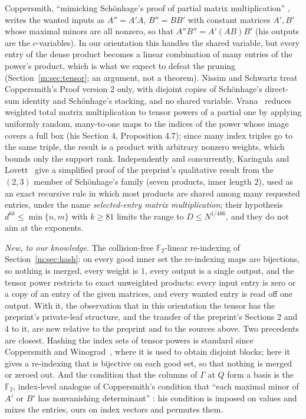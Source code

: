 \documentclass[11pt]{article}
\theoremstyle{definition}
\theoremstyle{remark}
\newcommand{\F}{\mathbb{F}_2}
\begin{document}
Coppersmith, ``mimicking Schönhage's proof of partial matrix multiplication'' \cite[p.~468]{Cop82}, writes the wanted inputs as $A''=A'A$, $B''=BB'$ with constant matrices $A',B'$ whose maximal minors are all nonzero, so that $A''B''=A'(AB)B'$ (his outputs are the $c$-variables). In our orientation this handles the shared variable, but every entry of the dense product becomes a linear combination of many entries of the power's product, which is what we expect to defeat the pruning (Section~\ref{m:sec:tensor}; an argument, not a theorem). Nissim and Schwartz treat Coppersmith's Proof version 2 only, with disjoint copies of Schönhage's direct-sum identity and Schönhage's stacking, and no shared variable. Vrana~\cite{Vra24} reduces weighted total matrix multiplication to tensor powers of a partial one by applying uniformly random, many-to-one maps to the indices of the power whose image covers a full box (his Section 4, Proposition 4.7); since many index triples go to the same triple, the result is a product with arbitrary nonzero weights, which bounds only the support rank.
Independently and concurrently, Karingula and Lovett~\cite{KL26} give a simplified proof of the preprint's qualitative result from the $(2,3)$ member of Schönhage's family (seven products, inner length $2$), used as an exact recursive rule in which most products are shared among many requested entries, under the name \emph{selected-entry matrix multiplication}; their hypothesis $d^{6k}\le\min\{n,m\}$ with $k\ge81$ limits the range to $D\le N^{1/486}$, and they do not aim at the exponents.

\emph{New, to our knowledge.} The collision-free $\F$-linear re-indexing of Section~\ref{m:sec:hash}: on every good inner set the re-indexing maps are bijections, so nothing is merged, every weight is $1$, every output is a single output, and the tensor power restricts to exact unweighted products: every input entry is zero or a copy of an entry of the given matrices, and every wanted entry is read off one output. With it, the observation that in this orientation the tensor has the preprint's private-leaf structure, and the transfer of the preprint's Sections 2 and 4 to it, are new relative to the preprint and to the sources above. Two precedents are closest. Hashing the index sets of tensor powers is standard since Coppersmith and Winograd~\cite{CW90}, where it is used to obtain disjoint blocks; here it gives a re-indexing that is bijective on each good set, so that nothing is merged or zeroed out. And the condition that the columns of $\Gamma$ at $Q$ form a basis is the $\F$, index-level analogue of Coppersmith's condition that ``each maximal minor of $A'$ or $B'$ has nonvanishing determinant'' \cite[p.~468]{Cop82}: his condition is imposed on values and mixes the entries, ours on index vectors and permutes them.
\end{document}
